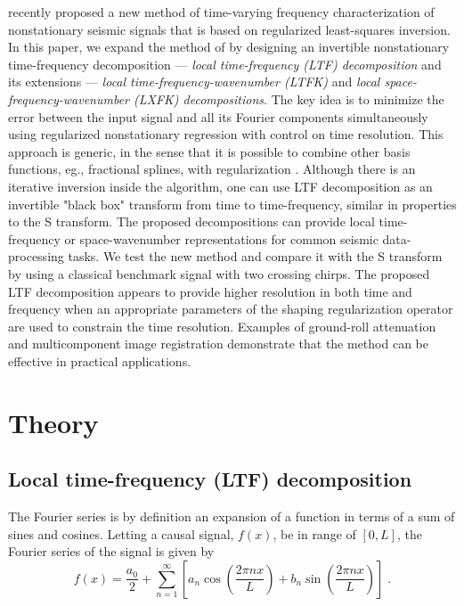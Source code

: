 \cite{Liu09,Liu11} recently proposed a new method of time-varying 
frequency characterization of nonstationary seismic signals that is
based on regularized least-squares inversion. In this paper, we
expand the method of \cite{Liu11} by designing an invertible
nonstationary time-frequency
decomposition ---
 \emph{local time-frequency (LTF) decomposition}
and its extensions --- \emph{local time-frequency-wavenumber (LTFK)}
and \emph{local space-frequency-wavenumber (LXFK)
decompositions}. The key idea is to minimize the
error between the input signal and all its Fourier components
simultaneously using regularized nonstationary regression
\cite[]{Fomel09} with control on time resolution. This approach is
generic, in the sense that it is possible to
combine other basis functions, eg., fractional splines, with
regularization \cite[]{Herrmann01}. Although there is an iterative
inversion inside the algorithm, one can use LTF
decomposition as
an invertible "black box" transform from time to 
time-frequency, similar in properties to the S transform. The proposed
decompositions can provide local time-frequency 
or space-wavenumber representations for common seismic data-processing
tasks. We test the new method and compare it with the S transform by
using a classical benchmark signal with two crossing chirps. The
proposed LTF
decomposition appears to provide higher
resolution in both time and frequency when
an appropriate parameters of the shaping 
regularization operator \cite[]{Fomel07b} are used to constrain
the time resolution. Examples of ground-roll attenuation and
multicomponent image registration demonstrate that the method can be
effective in practical applications.

\section{Theory}
\subsection{Local time-frequency (LTF) decomposition}

The Fourier series is by definition an expansion of a function in terms of 
a sum of sines and cosines. Letting a causal signal, $f(x)$, be in range of
$[0,L]$, the Fourier series of the signal is given by
\begin{equation}
  \label{eq:eq1}
  f(x) = \frac{a_0}{2} + \sum_{n=1}^{\infty} 
  \left[a_n\cos\left(\frac{2\pi nx}{L}\right)+ 
    b_n\sin \left(\frac{2\pi nx}{L}\right)\right]\;.
\end{equation}

